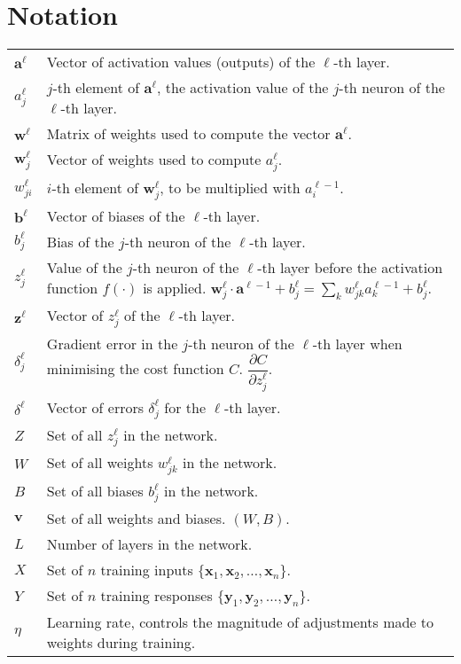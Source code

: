 \section*{Notation}

\begin{tabular}{p{1cm}p{13cm}}
$\mathbf{a}^\ell$ & Vector of activation values (outputs) of the $\ell$-th layer.\\
$a_j^\ell$ & $j$-th element of $\mathbf{a}^\ell$, the activation value of the $j$-th neuron of the $\ell$-th layer.\\
$\mathbf{w}^\ell$ & Matrix of weights used to compute the vector $\mathbf{a}^\ell$.\\
$\mathbf{w}^\ell_j$ & Vector of weights used to compute $a_j^\ell$.\\
$w_{ji}^\ell$ & $i$-th element of $\mathbf{w}^\ell_j$, to be multiplied with $a_i^{\ell-1}$.\\
$\mathbf{b}^\ell$ & Vector of biases of the $\ell$-th layer.\\
$b_j^\ell$ & Bias of the $j$-th neuron of the $\ell$-th layer.\\
$z_j^\ell$ & Value of the $j$-th neuron of the $\ell$-th layer before the activation function $f(\cdot)$ is applied. $\mathbf{w}_j^\ell\cdot \mathbf{a}^{\ell-1} + b_j^\ell= \sum_k w_{jk}^\ell a_k^{\ell-1} + b_j^\ell$.\\
$\mathbf{z}^\ell$ & Vector of $z_j^\ell$ of the $\ell$-th layer.\\
$\delta_j^\ell$ & Gradient error in the $j$-th neuron of the $\ell$-th layer when minimising the cost function $C$. $\dfrac{\partial C}{\partial z_j^\ell}$.\\
$\delta^\ell$ & Vector of errors $\delta_j^\ell$ for the $\ell$-th layer.\\
$Z$ & Set of all $z_j^\ell$ in the network. \\
$W$ & Set of all weights $w_{jk}^\ell$ in the network.\\
$B$ & Set of all biases $b_j^\ell$ in the network. \\
$\mathbf{v}$ & Set of all weights and biases. $(W,B)$.\\
$L$ & Number of layers in the network.\\
$X$ & Set of $n$ training inputs $\{\mathbf{x}_1, \mathbf{x}_2, \ldots, \mathbf{x}_n\}$. \\
$Y$ & Set of $n$ training responses $\{\mathbf{y}_1, \mathbf{y}_2, \ldots, \mathbf{y}_n\}$.\\
$\eta$ & Learning rate, controls the magnitude of adjustments made to weights during training.
\end{tabular}